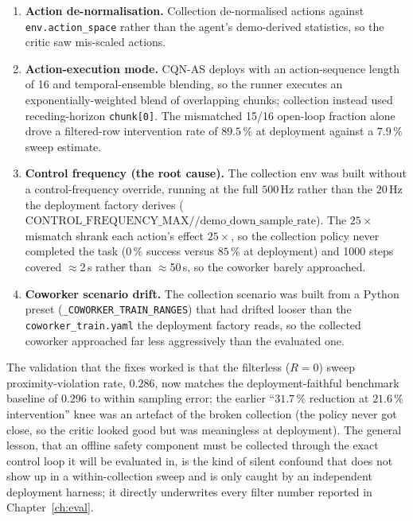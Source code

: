 \documentclass[11pt,a4paper]{report}
\newcommand{\cqnas}{CQN-AS}
\begin{document}
\begin{enumerate}[topsep=2pt,itemsep=2pt]
\item \textbf{Action de-normalisation.} Collection de-normalised
  actions against \texttt{env.action\_space} rather than the agent's
  demo-derived statistics, so the critic saw mis-scaled actions.
\item \textbf{Action-execution mode.} \cqnas{} deploys with an
  action-sequence length of 16 and temporal-ensemble blending, so the
  runner executes an exponentially-weighted blend of overlapping
  chunks; collection instead used receding-horizon \texttt{chunk[0]}.
  The mismatched 15/16 open-loop fraction alone drove a filtered-row
  intervention rate of $89.5\,\%$ at deployment against a $7.9\,\%$
  sweep estimate.
\item \textbf{Control frequency (the root cause).} The collection env
  was built without a control-frequency override, running at the full
  $500$\,Hz rather than the $20$\,Hz the deployment factory derives
  ($\text{CONTROL\_FREQUENCY\_MAX} \mathbin{//} \text{demo\_down\_sample\_rate}$).
  The $25\times$ mismatch shrank each action's effect $25\times$, so the
  collection policy never completed the task ($0\,\%$ success versus
  $85\,\%$ at deployment) and 1000 steps covered $\approx$2\,s rather
  than $\approx$50\,s, so the coworker barely approached.
\item \textbf{Coworker scenario drift.} The collection scenario was
  built from a Python preset (\texttt{\_COWORKER\_TRAIN\_RANGES}) that
  had drifted looser than the \texttt{coworker\_train.yaml} the
  deployment factory reads, so the collected coworker approached far
  less aggressively than the evaluated one.
\end{enumerate}

The validation that the fixes worked is that the filterless ($R = 0$)
sweep proximity-violation rate, $0.286$, now matches the
deployment-faithful benchmark baseline of $0.296$ to within sampling
error; the earlier ``$31.7\,\%$ reduction at $21.6\,\%$ intervention''
knee was an artefact of the broken collection (the policy never got
close, so the critic looked good but was meaningless at deployment).
The general lesson, that an offline safety component must be collected
through the exact control loop it will be evaluated in, is the kind of
silent confound that does not show up in a within-collection sweep and
is only caught by an independent deployment harness; it directly
underwrites every filter number reported in Chapter~\ref{ch:eval}.
\end{document}
